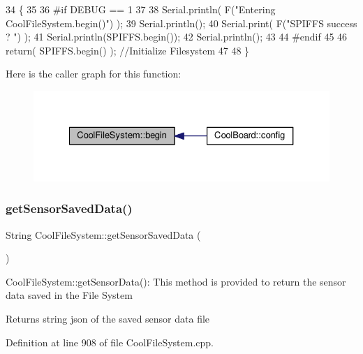\begin{DoxyCode}
34 \{
35 
36 \textcolor{preprocessor}{#if DEBUG == 1}
37 
38     Serial.println( F(\textcolor{stringliteral}{"Entering CoolFileSystem.begin()"}) );
39     Serial.println();   
40     Serial.print( F(\textcolor{stringliteral}{"SPIFFS success ? "}) );
41     Serial.println(SPIFFS.begin());
42     Serial.println();
43 
44 \textcolor{preprocessor}{#endif}
45 
46     \textcolor{keywordflow}{return}( SPIFFS.begin() );                                   \textcolor{comment}{//Initialize Filesystem}
47 
48 \}
\end{DoxyCode}
Here is the caller graph for this function\+:
\nopagebreak
\begin{figure}[H]
\begin{center}
\leavevmode
\includegraphics[width=327pt]{classCoolFileSystem_a6ba6f666ed4c530174f8569d2c636748_icgraph}
\end{center}
\end{figure}
\mbox{\label{classCoolFileSystem_a5c58bca3735c0ed3efb268d70ef998ef}} 
\subsubsection{\texorpdfstring{get\+Sensor\+Saved\+Data()}{getSensorSavedData()}}
{\footnotesize\ttfamily String Cool\+File\+System\+::get\+Sensor\+Saved\+Data (\begin{DoxyParamCaption}{ }\end{DoxyParamCaption})}

Cool\+File\+System\+::get\+Sensor\+Data()\+: This method is provided to return the sensor data saved in the File System

\begin{DoxyReturn}{Returns}
string json of the saved sensor data file 
\end{DoxyReturn}


Definition at line 908 of file Cool\+File\+System.\+cpp.



